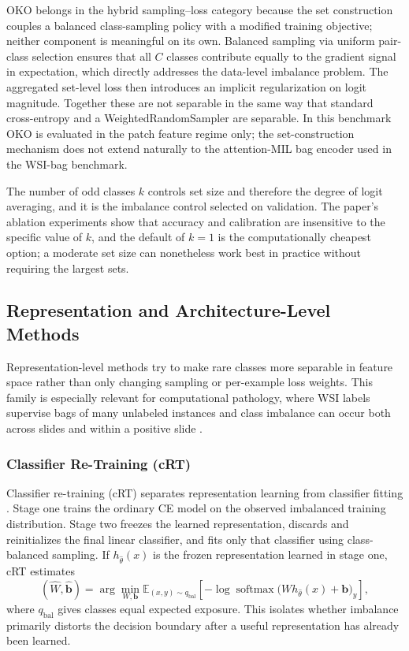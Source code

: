 \documentclass[11pt]{article}
\begin{document}
OKO belongs in the hybrid sampling--loss category because the set construction couples a balanced class-sampling policy with a modified training objective; neither component is meaningful on its own. Balanced sampling via uniform pair-class selection ensures that all $C$ classes contribute equally to the gradient signal in expectation, which directly addresses the data-level imbalance problem. The aggregated set-level loss then introduces an implicit regularization on logit magnitude. Together these are not separable in the same way that standard cross-entropy and a WeightedRandomSampler are separable. In this benchmark OKO is evaluated in the patch feature regime only; the set-construction mechanism does not extend naturally to the attention-MIL bag encoder used in the WSI-bag benchmark.

The number of odd classes $k$ controls set size and therefore the degree of logit averaging, and it is the imbalance control selected on validation. The paper's ablation experiments show that accuracy and calibration are insensitive to the specific value of $k$, and the default of $k=1$ is the computationally cheapest option; a moderate set size can nonetheless work best in practice without requiring the largest sets.

\subsection{Representation and Architecture-Level Methods}
Representation-level methods try to make rare classes more separable in feature space rather than only changing sampling or per-example loss weights. This family is especially relevant for computational pathology, where WSI labels supervise bags of many unlabeled instances and class imbalance can occur both across slides and within a positive slide \citep{juyal2024scMil}.

\subsubsection{Classifier Re-Training (cRT)}
Classifier re-training (cRT) separates representation learning from classifier fitting \citep{kang2020decouplingRepresentation}. Stage one trains the ordinary CE model on the observed imbalanced training distribution. Stage two freezes the learned representation, discards and reinitializes the final linear classifier, and fits only that classifier using class-balanced sampling. If $h_{\widehat\theta}(x)$ is the frozen representation learned in stage one, cRT estimates
\begin{equation}
  (\widehat W,\widehat{\mathbf b})
  =\arg\min_{W,\mathbf b}
  \mathbb E_{(x,y)\sim q_{\mathrm{bal}}}
  \left[-\log\operatorname{softmax}
  \bigl(W h_{\widehat\theta}(x)+\mathbf b\bigr)_y\right],
  \label{eq:crt}
\end{equation}
where $q_{\mathrm{bal}}$ gives classes equal expected exposure. This isolates whether imbalance primarily distorts the decision boundary after a useful representation has already been learned.
\end{document}
